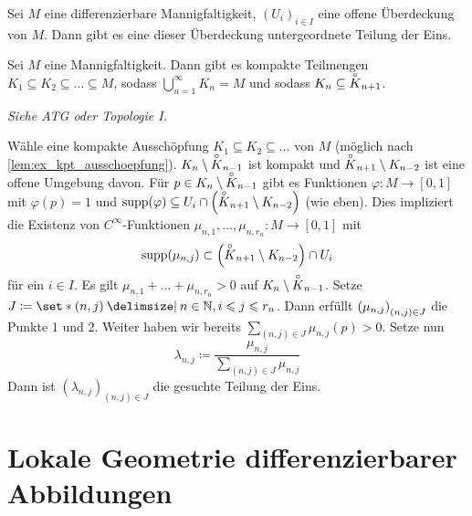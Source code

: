 \begin{satz}[{name=[Existenz einer untergeordneten Teilung der Eins]},label=satz:ex_teilung_eins]
	Sei $M$ eine differenzierbare Mannigfaltigkeit, $(U_i)_{i \in I}$ eine offene Überdeckung von $M$.
	Dann gibt es eine dieser Überdeckung untergeordnete Teilung der Eins.
\end{satz}

\begin{lemma}[{name=[Existenz kompakter Ausschöpfungen]},label=lem:ex_kpt_ausschoepfung]
	Sei $M$ eine Mannigfaltigkeit.
	Dann gibt es kompakte Teilmengen $K_1 \subseteq K_2 \subseteq \ldots \subseteq M$, sodass $\bigcup_{n=1}^\infty K_n = M$ und sodass $K_n \subseteq \interior{K}_{n+1}$.
\end{lemma}
\begin{beweis}
	\emph{Siehe ATG oder Topologie I.}
\end{beweis}
\begin{beweis}[{name={von \ref{satz:ex_teilung_eins}}}]
	Wähle eine kompakte Ausschöpfung $K_1 \subseteq K_2 \subseteq \ldots $ von $M$ (möglich nach \cref{lem:ex_kpt_ausschoepfung}).
	$K_n \setminus \interior{K}_{n-1}$ ist kompakt und $\interior{K}_{n+1} \setminus K_{n-2}$ ist eine offene Umgebung davon.
	Für $p \in K_n \setminus \interior{K}_{n-1}$ gibt es Funktionen $\varphi \colon M \to [0,1]$ mit $\varphi(p)=1$ und $\supp(\varphi) \subseteq U_i \cap \enbrace*{\interior{K}_{n+1} \setminus K_{n-2}}$ (wie eben).
	Dies impliziert die Existenz von $C^\infty$-Funktionen $\mu_{n,1}, \ldots , \mu_{n,r_n} \colon M \to [0,1]$ mit
	\[
		\supp(\mu_{n,j}) \subset \enbrace*{\interior{K}_{n+1} \setminus K_{n-2}} \cap U_i
	\]
	für ein $i \in I$.
	Es gilt $\mu_{n,1}+ \ldots +  \mu_{n,r_n} > 0$ auf $K_n \setminus \interior{K}_{n-1}$.
	Setze $J \coloneqq \set*{(n,j) \given n \in \mathbb{N}, i \le j \le r_n}$.
	Dann erfüllt $\enbrace*{\mu_{n,j}}_{(n,j) \in J}$ die Punkte 1 und 2.
	Weiter haben wir bereits $\sum_{(n,j) \in J} \mu_{n,j}(p) >0$.
	Setze nun
	\[
		\lambda_{n,j} \coloneqq \frac{\mu_{n,j}}{\sum_{(n,j) \in J} \mu_{n,j}} 
	\]
	Dann ist $(\lambda_{n,j})_{(n,j) \in J}$ die gesuchte Teilung der Eins.
\end{beweis}


\section{Lokale Geometrie differenzierbarer Abbildungen} %
\label{sec:lokale_geometrie_differenzierbarer_abbildungen}

